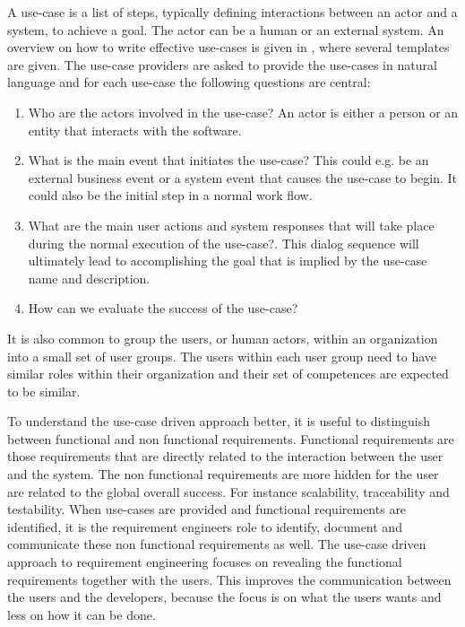 A use-case is a list of steps, typically defining interactions between an actor and a system, to achieve a goal. The actor can be a human or an external system.  An overview on how to write effective use-cases is given in \cite{Coc01}, where several templates are given. The use-case providers are asked to provide the use-cases in natural language and for each use-case the following questions are central:

\begin{enumerate}
\item Who are the actors involved in the use-case? An actor is either a person or an entity that interacts with the software.  
\item What is the main event that initiates the use-case? This could e.g. be an external business event or a system event that causes the use-case to begin.  It could also be the initial step in a normal work flow. 
\item What are the main user actions and system responses that will take place during the normal execution of the use-case?. This dialog sequence will ultimately lead to accomplishing the goal that is implied by the use-case name and description.
\item How can we evaluate the success of the use-case?
\end{enumerate}
 
It is also common to group the users, or human actors, within an organization into a small set of user groups. The users within each user group need to have similar roles within their organization and their set of competences are expected to be similar. 

To understand the use-case driven approach better, it is useful to distinguish between functional and non functional requirements.  Functional requirements are those requirements that are directly related to the interaction between the user and the system.  The non functional requirements are more hidden for the user are related to the global overall success.  For instance scalability, traceability and testability.  When use-cases are provided and functional requirements are identified, it is the requirement engineers role to identify, document and communicate these non functional requirements as well.  The use-case driven approach to requirement engineering focuses on revealing the functional requirements together with the users.  This improves the communication between the users and the developers, because the focus is on what the users wants and less on how it can be done.
